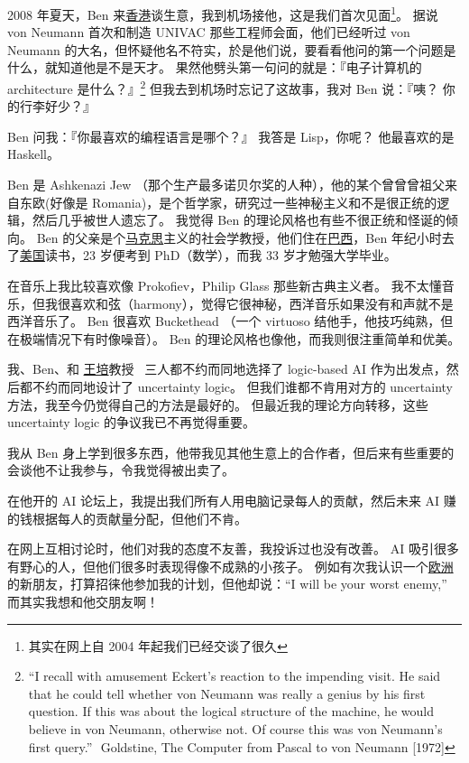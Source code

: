 \documentclass[12pt]{report}
\newcommand*\dashh{\textemdash\,\,}
\begin{document}
2008 年夏天，Ben 来\uline{香港}谈生意，我到机场接他，这是我们首次见面\footnote{其实在网上自 2004 年起我们已经交谈了很久}。 据说 von Neumann 首次和制造 UNIVAC 那些工程师会面，他们已经听过 von Neumann 的大名，但怀疑他名不符实，於是他们说，要看看他问的第一个问题是什么，就知道他是不是天才。  果然他劈头第一句问的就是：『电子计算机的 architecture 是什么？』\footnote{``I recall with amusement Eckert's reaction to the impending visit. He said that he could tell whether von Neumann was really a genius by his first question. If this was about the logical structure of the machine, he would believe in von Neumann, otherwise not. Of course this was von Neumann's first query.'' \dashh Goldstine, The Computer from Pascal to von Neumann [1972]}  但我去到机场时忘记了这故事，我对 Ben 说：『咦？ 你的行李好少？』

Ben 问我：『你最喜欢的编程语言是哪个？』 我答是 Lisp，你呢？ 他最喜欢的是 Haskell。

Ben 是 Ashkenazi Jew （那个生产最多诺贝尔奖的人种），他的某个曾曾曾祖父来自东欧(好像是 Romania)，是个哲学家，研究过一些神秘主义和不是很正统的逻辑，然后几乎被世人遗忘了。 我觉得 Ben 的理论风格也有些不很正统和怪诞的倾向。  Ben 的父亲是个\uline{马克思}主义的社会学教授，他们住在\uline{巴西}，Ben 年纪小时去了\uline{美国}读书，23 岁便考到 PhD（数学），而我 33 岁才勉强大学毕业。

在音乐上我比较喜欢像 Prokofiev，Philip Glass 那些新古典主义者。 我不太懂音乐，但我很喜欢和弦（harmony），觉得它很神秘，西洋音乐如果没有和声就不是西洋音乐了。 Ben 很喜欢 Buckethead （一个 virtuoso 结他手，他技巧纯熟，但在极端情况下有时像噪音）。 Ben 的理论风格也像他，而我则很注重简单和优美。

我、Ben、和 \uline{王培}教授 ~三人都不约而同地选择了 logic-based AI 作为出发点，然后都不约而同地设计了 uncertainty logic。  但我们谁都不肯用对方的 uncertainty 方法，我至今仍觉得自己的方法是最好的。 但最近我的理论方向转移，这些 uncertainty logic 的争议我已不再觉得重要。

我从 Ben 身上学到很多东西，他带我见其他生意上的合作者，但后来有些重要的会谈他不让我参与，令我觉得被出卖了。

在他开的 AI 论坛上，我提出我们所有人用电脑记录每人的贡献，然后未来 AI 赚的钱根据每人的贡献量分配，但他们不肯。

在网上互相讨论时，他们对我的态度不友善，我投诉过也没有改善。  AI 吸引很多有野心的人，但他们很多时表现得像不成熟的小孩子。  例如有次我认识一个\uline{欧洲}的新朋友，打算招徕他参加我的计划，但他却说：``I will be your worst enemy,'' 而其实我想和他交朋友啊！
\end{document}

